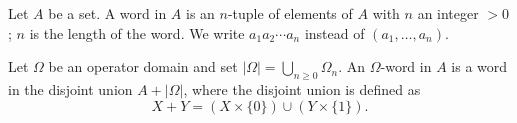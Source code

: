 Let $A$ be a set. A word in $A$ is an $n$-tuple of elements of $A$ with $n$ an integer $> 0$; $n$ is the length of the word. We write $a_1 a_2 \cdots a_n$ instead of $(a_1, \ldots, a_n)$.

Let $\Omega$ be an operator domain and set $|\Omega| = \bigcup_{n \geq 0} \Omega_n$. An $\Omega$-word in $A$ is a word in the disjoint union $A + |\Omega|$, where the disjoint union is defined as
$$
X + Y = (X \times \{0\}) \cup (Y \times \{1\}).
$$
